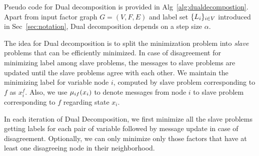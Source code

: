 \documentclass[letterpaper, 10 pt, conference]{ieeeconf} %
\begin{document}
Pseudo code for Dual decomposition is provided in Alg~\ref{alg:dualdecompostion}. Apart from input factor graph $G = (V, F, E)$ and label set $\{L_i\}_{i \in V}$ introduced in Sec~\ref{sec:notation}, Dual decomposition depends on a step size $\alpha$.

The idea for Dual decomposition is to split the minimization problem into \emph{slave} problems that can be efficiently minimized. In case of disagreement for minimizing label among slave problems, the messages to slave problems are updated until the slave problems agree with each other. We maintain the minimizing label for variable node $i$, computed by slave problem corresponding to $f$ as $x^f_i$. Also, we use $\mu_{if}(x_i)$ to denote messages from node $i$ to slave problem corresponding to $f$ regarding state $x_i$.

In each iteration of Dual Decomposition, we first minimize all the slave problems getting labels for each pair of variable followed by message update in case of disagreement. Optionally, we can only minimize only those factors that have at least one disagreeing node in their neighborhood.
\end{document}
